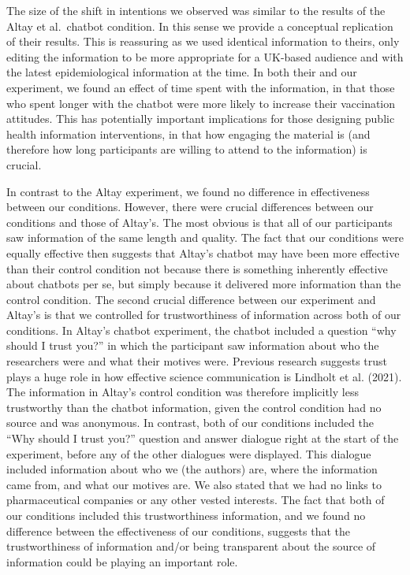 \documentclass[
  english,
  ,jou,floatsintext]{apa6}
\begin{document}
The size of the shift in intentions we observed was similar to the results of the Altay et al.~chatbot condition. In this sense we provide a conceptual replication of their results. This is reassuring as we used identical information to theirs, only editing the information to be more appropriate for a UK-based audience and with the latest epidemiological information at the time. In both their and our experiment, we found an effect of time spent with the information, in that those who spent longer with the chatbot were more likely to increase their vaccination attitudes. This has potentially important implications for those designing public health information interventions, in that how engaging the material is (and therefore how long participants are willing to attend to the information) is crucial.

In contrast to the Altay experiment, we found no difference in effectiveness between our conditions. However, there were crucial differences between our conditions and those of Altay's. The most obvious is that all of our participants saw information of the same length and quality. The fact that our conditions were equally effective then suggests that Altay's chatbot may have been more effective than their control condition not because there is something inherently effective about chatbots per se, but simply because it delivered more information than the control condition. The second crucial difference between our experiment and Altay's is that we controlled for trustworthiness of information across both of our conditions. In Altay's chatbot experiment, the chatbot included a question ``why should I trust you?'' in which the participant saw information about who the researchers were and what their motives were. Previous research suggests trust plays a huge role in how effective science communication is Lindholt et al. (2021). The information in Altay's control condition was therefore implicitly less trustworthy than the chatbot information, given the control condition had no source and was anonymous. In contrast, both of our conditions included the ``Why should I trust you?'' question and answer dialogue right at the start of the experiment, before any of the other dialogues were displayed. This dialogue included information about who we (the authors) are, where the information came from, and what our motives are. We also stated that we had no links to pharmaceutical companies or any other vested interests. The fact that both of our conditions included this trustworthiness information, and we found no difference between the effectiveness of our conditions, suggests that the trustworthiness of information and/or being transparent about the source of information could be playing an important role.
\end{document}
